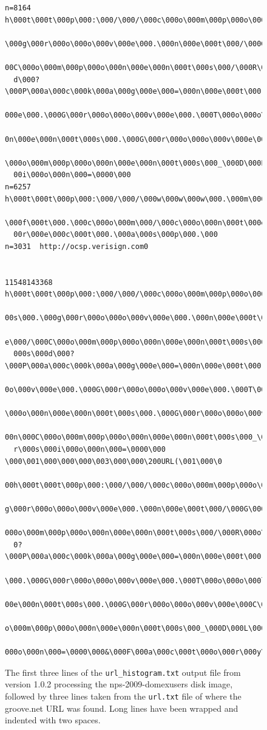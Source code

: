 \begin{figure}
\begin{Verbatim}[fontsize=\footnotesize]
n=8164  h\000t\000t\000p\000:\000/\000/\000c\000o\000m\000p\000o\000n\000e\000n\000t\000s\000.
  \000g\000r\000o\000o\000v\000e\000.\000n\000e\000t\000/\000G\000r\000o\000o\000v\000e\000/\0
  00C\000o\000m\000p\000o\000n\000e\000n\000t\000s\000/\000R\000o\000o\000t\000.\000o\000s\000
  d\000?\000P\000a\000c\000k\000a\000g\000e\000=\000n\000e\000t\000.\000g\000r\000o\000o\000v\
  000e\000.\000G\000r\000o\000o\000v\000e\000.\000T\000o\000o\000l\000C\000o\000m\000p\000o\00
  0n\000e\000n\000t\000s\000.\000G\000r\000o\000o\000v\000e\000C\000o\000m\000m\000o\000n\000C
  \000o\000m\000p\000o\000n\000e\000n\000t\000s\000_\000D\000L\000L\000&\000V\000e\000r\000s\0
  00i\000o\000n\000=\0000\000
n=6257  h\000t\000t\000p\000:\000/\000/\000w\000w\000w\000.\000m\000i\000c\000r\000o\000s\000o
  \000f\000t\000.\000c\000o\000m\000/\000c\000o\000n\000t\000e\000n\000t\000r\000e\000d\000i\0
  00r\000e\000c\000t\000.\000a\000s\000p\000.\000
n=3031  http://ocsp.verisign.com0


11548143368     h\000t\000t\000p\000:\000/\000/\000c\000o\000m\000p\000o\000n\000e\000n\000t\0
  00s\000.\000g\000r\000o\000o\000v\000e\000.\000n\000e\000t\000/\000G\000r\000o\000o\000v\000
  e\000/\000C\000o\000m\000p\000o\000n\000e\000n\000t\000s\000/\000R\000o\000o\000t\000.\000o\
  000s\000d\000?\000P\000a\000c\000k\000a\000g\000e\000=\000n\000e\000t\000.\000g\000r\000o\00
  0o\000v\000e\000.\000G\000r\000o\000o\000v\000e\000.\000T\000o\000o\000l\000C\000o\000m\000p
  \000o\000n\000e\000n\000t\000s\000.\000G\000r\000o\000o\000v\000e\000C\000o\000m\000m\000o\0
  00n\000C\000o\000m\000p\000o\000n\000e\000n\000t\000s\000_\000D\000L\000L\000&\000V\000e\000
  r\000s\000i\000o\000n\000=\0000\000       \000\001\000\000\000\003\000\000\200URL(\001\000\0
  00h\000t\000t\000p\000:\000/\000/\000c\000o\000m\000p\000o\000n\000e\000n\000t\000s\000.\000
  g\000r\000o\000o\000v\000e\000.\000n\000e\000t\000/\000G\000r\000o\000o\000v\000e\000/\000C\
  000o\000m\000p\000o\000n\000e\000n\000t\000s\000/\000R\000o\000o\000t\000.\000o\000s\000d\00
  0?\000P\000a\000c\000k\000a\000g\000e\000=\000n\000e\000t\000.\000g\000r\000o\000o\000v\000e
  \000.\000G\000r\000o\000o\000v\000e\000.\000T\000o\000o\000l\000C\000o\000m\000p\000o\000n\0
  00e\000n\000t\000s\000.\000G\000r\000o\000o\000v\000e\000C\000o\000m\000m\000o\000n\000C\000
  o\000m\000p\000o\000n\000e\000n\000t\000s\000_\000D\000L\000L\000&\000V\000e\000r\000s\000i\
  000o\000n\000=\0000\000&\000F\000a\000c\000t\000o\000r\000y\000
\end{Verbatim}
\caption{The first three lines of the \texttt{url\_histogram.txt}
  output file from \be version 1.0.2 processing the
  nps-2009-domexusers disk image, followed by three lines taken from
  the \texttt{url.txt} file of where the groove.net URL was
  found. Long lines have been wrapped and indented with two spaces.}\label{url_histogram-1.0.2}
\end{figure}

